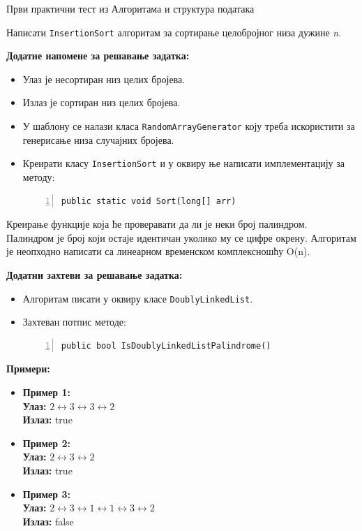 
Први практични тест из Алгоритама и структура података

Написати \texttt{InsertionSort} алгоритам за сортирање целобројног низа дужине \textit{n}.

\textbf{Додатне напомене за решавање задатка:}
\begin{itemize}
    \item Улаз је несортиран низ целих бројева.
    \item Излаз је сортиран низ целих бројева.
    \item У шаблону се налази класа \texttt{RandomArrayGenerator} коју треба искористити за генерисање низа случајних бројева.
    \item Креирати класу \texttt{InsertionSort} и у оквиру ње написати имплементацију за методу:
    \begin{Verbatim}[fontsize=\footnotesize, numbers=left, xleftmargin=10mm]
public static void Sort(long[] arr)
    \end{Verbatim}
\end{itemize}



Креирање функције која ће проверавати да ли је неки број палиндром. Палиндром је број који остаје идентичан уколико му се цифре окрену. Алгоритам је неопходно написати са линеарном временском комплексношћу O(n).

\textbf{Додатни захтеви за решавање задатка:}
\begin{itemize}
    \item Алгоритам писати у оквиру класе \texttt{DoublyLinkedList}.
    \item Захтеван потпис методе:
    \begin{Verbatim}[fontsize=\footnotesize, numbers=left, xleftmargin=10mm]
public bool IsDoublyLinkedListPalindrome()
    \end{Verbatim}
\end{itemize}

\textbf{Примери:}
\begin{itemize}
    \item \textbf{Пример 1:} \\
          \textbf{Улаз:} $2 \leftrightarrow 3 \leftrightarrow 3 \leftrightarrow 2$ \\
          \textbf{Излаз:} true
    \item \textbf{Пример 2:} \\
          \textbf{Улаз:} $2 \leftrightarrow 3 \leftrightarrow 2$ \\
          \textbf{Излаз:} true
    \item \textbf{Пример 3:} \\
          \textbf{Улаз:} $2 \leftrightarrow 3 \leftrightarrow 1 \leftrightarrow 1 \leftrightarrow 3 \leftrightarrow 2$ \\
          \textbf{Излаз:} false
\end{itemize}



